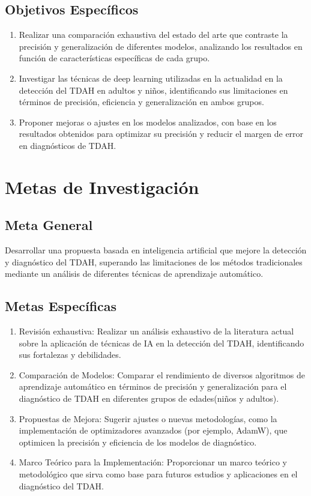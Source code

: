 \documentclass[10pt,journal,compsoc]{IEEEtran}
\begin{document}
\subsection{Objetivos Específicos}
\begin{enumerate}
    \item Realizar una comparación exhaustiva del estado del arte que contraste la precisión y generalización de diferentes modelos, analizando los resultados en función de características específicas de cada grupo.
    \item Investigar las técnicas de deep learning utilizadas en la actualidad en la detección del TDAH en adultos y niños, identificando sus limitaciones en términos de precisión, eficiencia y generalización en ambos grupos.
    \item Proponer mejoras o ajustes en los modelos analizados, con base en los resultados obtenidos para optimizar su precisión y reducir el margen de error en diagnósticos de TDAH.
\end{enumerate}

\section{Metas de Investigación}

\subsection{Meta General}
Desarrollar una propuesta basada en inteligencia artificial que mejore la detección y diagnóstico del TDAH, superando las limitaciones de los métodos tradicionales mediante un análisis de diferentes técnicas de aprendizaje automático.

\subsection{Metas Específicas}
\begin{enumerate}
    \item Revisión exhaustiva: Realizar un análisis exhaustivo de la literatura actual sobre la aplicación de técnicas de IA en la detección del TDAH, identificando sus fortalezas y debilidades.
    \item Comparación de Modelos: Comparar el rendimiento de diversos algoritmos de aprendizaje automático en términos de precisión y generalización para el diagnóstico de TDAH en diferentes grupos de edades(niños y adultos).
    \item Propuestas de Mejora: Sugerir ajustes o nuevas metodologías, como la implementación de optimizadores avanzados (por ejemplo, AdamW), que optimicen la precisión y eficiencia de los modelos de diagnóstico.
    \item Marco Teórico para la Implementación: Proporcionar un marco teórico y metodológico que sirva como base para futuros estudios y aplicaciones en el diagnóstico del TDAH.
\end{enumerate}
\end{document}
